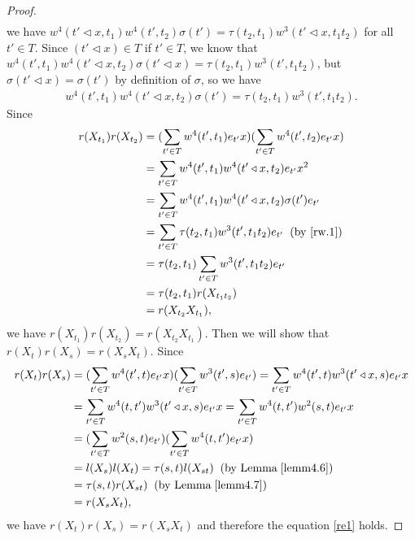 \documentclass[a4paper,11pt]{amsart}
\numberwithin{equation}{section}
\begin{document}
\begin{proof}
\begin{align*}
\end{align*}
we have $w^4(t' \triangleleft x,t_1) w^4(t',t_2) \sigma(t')=\tau(t_2,t_1) w^3(t'\triangleleft x,t_1 t_2)$ for all $t'\in T$. Since $(t'\triangleleft x)\in T$ if $t'\in T$, we know that
$w^4(t',t_1) w^4(t'\triangleleft x,t_2) \sigma(t'\triangleleft x)=\tau(t_2,t_1) w^3(t',t_1 t_2)$, but $\sigma(t'\triangleleft x)=\sigma(t')$ by definition of $\sigma$, so we have
\begin{align*}
w^4(t',t_1) w^4(t'\triangleleft x,t_2) \sigma(t')=\tau(t_2,t_1) w^3(t',t_1 t_2).
\end{align*}
Since
\begin{align*}
r(X_{t_1})r(X_{t_2})&=(\sum_{t'\in T} w^4(t',t_1)e_{t'}x) (\sum_{t'\in T} w^4(t',t_2)e_{t'}x)\\
&=\sum_{t'\in T} w^4(t',t_1) w^4(t' \triangleleft x,t_2) e_{t'}x^2\\
&=\sum_{t'\in T} w^4(t',t_1) w^4(t' \triangleleft x,t_2) \sigma(t') e_{t'}\\
&=\sum_{t'\in T} \tau(t_2,t_1) w^3(t',t_1 t_2) e_{t'}\;\;(\text{by }\eqref{rw.1})\\
&=\tau(t_2,t_1) \sum_{t'\in T} w^3(t',t_1 t_2) e_{t'}\\
&=\tau(t_2,t_1)r(X_{t_1 t_2})\\
&=r(X_{t_2} X_{t_1}),
\end{align*}
we have $r(X_{t_1})r(X_{t_2})=r(X_{t_2} X_{t_1})$. Then we will show that $r(X_t)r(X_s)=r(X_{s}X_{t})$. Since
\begin{align*}
r(X_t)r(X_s)&=(\sum_{t'\in T} w^4(t',t)e_{t'}x) (\sum_{t'\in T} w^3(t',s)e_{t'})
=\sum_{t'\in T} w^4(t',t) w^3(t'\triangleleft x,s)e_{t'}x\\
&=\sum_{t'\in T} w^4(t,t') w^3(t'\triangleleft x,s)e_{t'}x
=\sum_{t'\in T} w^4(t,t') w^2(s,t)e_{t'}x\\
&=(\sum_{t'\in T} w^2(s,t)e_{t'}) (\sum_{t'\in T} w^4(t,t')e_{t'}x)\\
&=l(X_s)l(X_t)
=\tau(s,t)l(X_{st}) \;\;(\text{by Lemma}\;\ref{lemm4.6})\\
&=\tau(s,t)r(X_{st})\;\;(\text{by Lemma}\;\ref{lemm4.7})\\
&=r(X_{s} X_{t}),
\end{align*}
we have $r(X_t)r(X_s)=r(X_{s}X_{t})$ and therefore the equation \eqref{re1} holds.


\end{proof}
\end{document}
